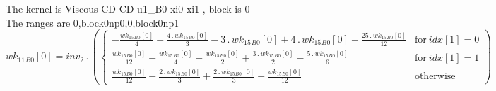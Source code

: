 \documentclass{article}
\begin{document}
\noindent The kernel is Viscous CD CD u1_B0 xi0 xi1 , block is 0\\\noindent The ranges are 0,block0np0,0,block0np1\\\begin{dmath}{wk_{11}{_{B0}}}[{0}] = inv_2 \,.\, \left(\begin{cases} - \frac{{wk_{15}{_{B0}}}[{0}]}{4} + \frac{4 \,.\, {wk_{15}{_{B0}}}[{0}]}{3} - 3 \,.\, {wk_{15}{_{B0}}}[{0}] + 4 \,.\, {wk_{15}{_{B0}}}[{0}] - \frac{25 \,.\, 
{wk_{15}{_{B0}}}[{0}]}{12} & \text{for}\: {idx}[{1}] = 0 \\\frac{{wk_{15}{_{B0}}}[{0}]}{12} - \frac{{wk_{15}{_{B0}}}[{0}]}{4} - \frac{{wk_{15}{_{B0}}}[{0}]}{2} + \frac{3 \,.\, {wk_{15}{_{B0}}}[{0}]}{2} - \frac{5 \,.\, {wk_{15}{_{B0}}}[{0}]}{6} & 
\text{for}\: {idx}[{1}] = 1 \\\frac{{wk_{15}{_{B0}}}[{0}]}{12} - \frac{2 \,.\, {wk_{15}{_{B0}}}[{0}]}{3} + \frac{2 \,.\, {wk_{15}{_{B0}}}[{0}]}{3} - \frac{{wk_{15}{_{B0}}}[{0}]}{12} & \text{otherwise} \end{cases}\right)\end{dmath}
\end{document}
